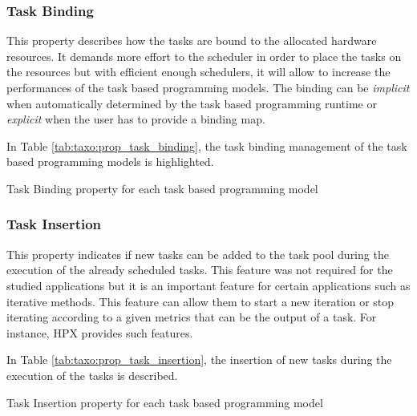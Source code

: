 \subsubsection{Task Binding}
This property describes how the tasks are bound to the allocated hardware resources.
It demands more effort to the scheduler in order to place the tasks on the resources but with efficient enough schedulers, it will allow to increase the performances of the task based programming models.
The binding can be \textit{implicit} when automatically determined by the task based programming runtime or \textit{explicit} when the user has to provide a binding map.

In Table \ref{tab:taxo:prop_task_binding}, the task binding management of the task based programming models is highlighted.
\begin{table}[H]
	\caption{Task Binding property for each task based programming model \label{tab:taxo:prop_task_binding}}
	\centering
	\begin{multicols}{2}
		

		
	\end{multicols}
\end{table}

\subsubsection{Task Insertion}
This property indicates if new tasks can be added to the task pool during the execution of the already scheduled tasks.
This feature was not required for the studied applications but it is an important feature for certain applications such as iterative methods.
This feature can allow them to start a new iteration or stop iterating according to a given metrics that can be the output of a task.
For instance, HPX provides such features.

In Table \ref{tab:taxo:prop_task_insertion}, the insertion of new tasks during the execution of the tasks is described.
\begin{table}[H]
	\caption{Task Insertion property for each task based programming model \label{tab:taxo:prop_task_insertion}}
	\centering
	\begin{multicols}{2}
		

		
	\end{multicols}
\end{table}


